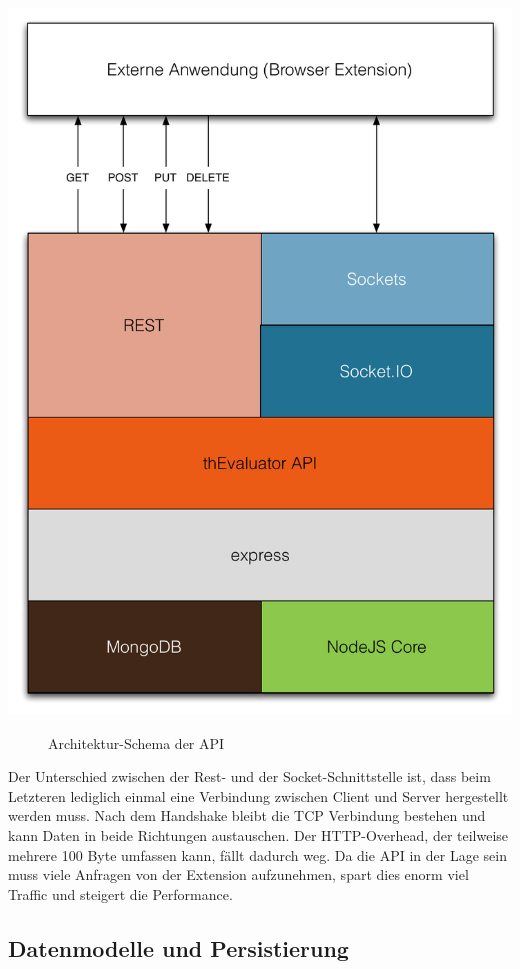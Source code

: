 \begin{center}
\includegraphics[scale=0.49]{./images/api-architecture}
\end{center}
\begin{figure}[htb]
   \centering
   \caption{Architektur-Schema der API}
    \label{api}
\end{figure}

Der Unterschied zwischen der Rest- und der Socket-Schnittstelle ist, dass beim Letzteren lediglich einmal eine Verbindung zwischen Client und Server hergestellt werden muss. Nach dem Handshake bleibt die TCP Verbindung bestehen und kann Daten in beide Richtungen austauschen. Der HTTP-Overhead, der teilweise mehrere 100 Byte umfassen kann, fällt dadurch weg. Da die API in der Lage sein muss viele Anfragen von der Extension aufzunehmen, spart dies enorm viel Traffic und steigert die Performance.

\subsection{Datenmodelle und Persistierung}
\label{mongo}

